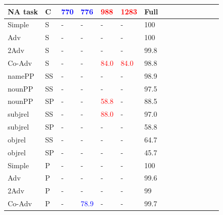 \begin{center}
\begin{table}[ht]
\begin{tabular}{|P{1.4cm}|P{0.4cm}||P{0.6cm}|P{0.6cm}|P{0.6cm}|P{0.6cm}|P{0.6cm}|P{0.6cm}|P{0.6cm}|P{0.6cm}|P{0.6cm}|P{0.6cm}|P{0.6cm}|P{0.6cm}||P{0.6cm}|}
\hline
\B NA task & \B C & \B \textcolor{blue}{770} & \B \textcolor{blue}{776} & \B \textcolor{red}{988} & \B \textcolor{red}{1283} & \B Full \\
\hline
\hline


\B Simple & \B S & - &  - &    - &  - &  100 \\

\B Adv & \B S &  - &  - &  - &  - &  100 \\

\B 2Adv & \B S &  - &  - &  - &  - &  99.8 \\

\B Co-Adv & \B S &  - &  - &  \textcolor{red}{84.0} &  \textcolor{red}{84.0} &  98.8 \\

\B namePP & \B SS &  - &  - &  - &  - &  98.9 \\

\B nounPP & \B SS &  - &  - & - &  - &  97.5 \\

\B nounPP & \B SP &  \B - &  - &  \textcolor{red}{58.8} &  - &  88.5 \\

\B subjrel & \B SS &   - &  - & \textcolor{red}{88.0} &  - &  97.0 \\

\B subjrel & \B SP &  \B - &  - &  - &  - &  58.8 \\

\B objrel & \B SS & \B - &  - &  - &  - &  64.7 \\

\B objrel & \B SP &  \B - &  - &  - &  - &  45.7 \\

\hline
\B Simple & \B P &  - &  - &  - &  - &  100 \\

\B Adv & \B P &  - &  - &  - &  - &  99.6 \\

\B 2Adv & \B P & - &  - & - & - &  99 \\

\B Co-Adv & \B P &  - &  \textcolor{blue}{78.9} & - &  - &  99.7 \\


\end{tabular}
\end{table}
\end{center}
